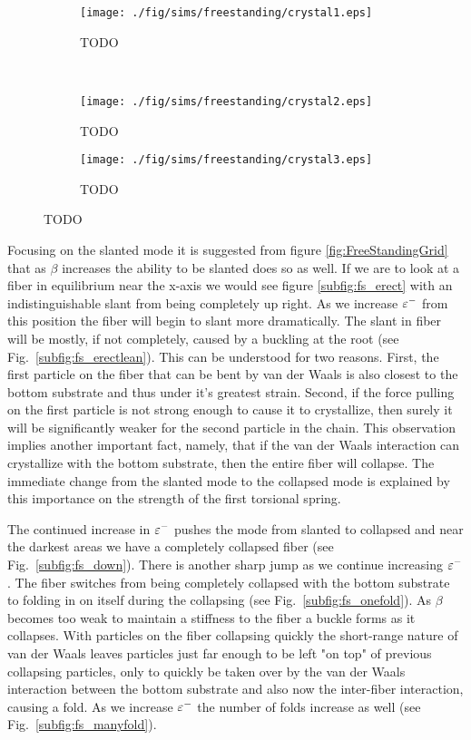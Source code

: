 	\begin{figure*}
		\centering
		\begin{subfigure}{.5\textwidth}
			\centering
			\texttt{[image: ./fig/sims/freestanding/crystal1.eps]}
			\caption{TODO \label{subfig:fs_crystal1}}
		\end{subfigure}%
		~
		\begin{subfigure}{.5\textwidth}
			\centering
			\texttt{[image: ./fig/sims/freestanding/crystal2.eps]}
			\caption{TODO \label{subfig:fs_crystal2}}
		\end{subfigure}

		\begin{subfigure}{.5\textwidth}
			\centering
			\texttt{[image: ./fig/sims/freestanding/crystal3.eps]}
			\caption{TODO \label{subfig:fs_crystal3}}
		\end{subfigure}		
		\caption{TODO\label{fig:fs_crystal}}	
	\end{figure*}

Focusing on the slanted mode it is suggested from figure \ref{fig:FreeStandingGrid} that as $\beta$ increases the ability to be slanted does so as well. If we are to look at a fiber in equilibrium near the x-axis we would see figure \ref{subfig:fs_erect} with an indistinguishable slant from being completely up right. As we increase $\varepsilon^-$ from this position the fiber will begin to slant more dramatically. The slant in fiber will be mostly, if not completely, caused by a buckling at the root (see Fig.~\ref{subfig:fs_erectlean}). This can be understood for two reasons. First, the first particle on the fiber that can be bent by van der Waals is also closest to the bottom substrate and thus under it's greatest strain. Second, if the force pulling on the first particle is not strong enough to cause it to crystallize, then surely it will be significantly weaker for the second particle in the chain. This observation implies another important fact, namely, that if the van der Waals interaction can crystallize with the bottom substrate, then the entire fiber will collapse. The immediate change from the slanted mode to the collapsed mode is explained by this importance on the strength of the first torsional spring.
	
The continued increase in $\varepsilon^-$ pushes the mode from slanted to collapsed and near the darkest areas we have a completely collapsed fiber (see Fig.~\ref{subfig:fs_down}). There is another sharp jump as we continue increasing $\varepsilon^-$. The fiber switches from being completely collapsed with the bottom substrate to folding in on itself during the collapsing (see Fig.~\ref{subfig:fs_onefold}). As $\beta$ becomes too weak to maintain a stiffness to the fiber a buckle forms as it collapses. With particles on the fiber collapsing quickly the short-range nature of van der Waals leaves particles just far enough to be left "on top" of previous collapsing particles, only to quickly be taken over by the van der Waals interaction between the bottom substrate and also now the inter-fiber interaction, causing a fold. As we increase $\varepsilon^-$ the number of folds increase as well (see Fig.~\ref{subfig:fs_manyfold}).
	
